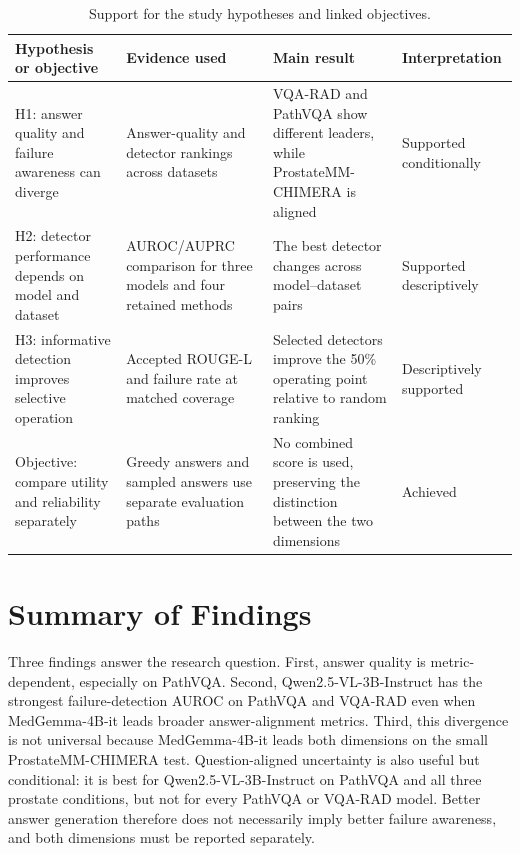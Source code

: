 \begin{table}[htbp]
    \centering
    \caption{Support for the study hypotheses and linked objectives.}
    \label{tab:hypothesis-support}
    \small
    \begin{tabularx}{\textwidth}{>{\raggedright\arraybackslash}p{3.1cm}XX>{\raggedright\arraybackslash}p{2.1cm}}
        \toprule
        Hypothesis or objective & Evidence used & Main result & Interpretation \\
        \midrule
        H1: answer quality and failure awareness can diverge & Answer-quality and detector rankings across datasets & VQA-RAD and PathVQA show different leaders, while ProstateMM-CHIMERA is aligned & Supported conditionally \\
        H2: detector performance depends on model and dataset & AUROC/AUPRC comparison for three models and four retained methods & The best detector changes across model--dataset pairs & Supported descriptively \\
        H3: informative detection improves selective operation & Accepted ROUGE-L and failure rate at matched coverage & Selected detectors improve the 50\% operating point relative to random ranking & Descriptively supported \\
        Objective: compare utility and reliability separately & Greedy answers and sampled answers use separate evaluation paths & No combined score is used, preserving the distinction between the two dimensions & Achieved \\
        \bottomrule
    \end{tabularx}
\end{table}

\section{Summary of Findings}

Three findings answer the research question. First, answer quality is metric-dependent, especially on PathVQA. Second, Qwen2.5-VL-3B-Instruct has the strongest failure-detection AUROC on PathVQA and VQA-RAD even when MedGemma-4B-it leads broader answer-alignment metrics. Third, this divergence is not universal because MedGemma-4B-it leads both dimensions on the small ProstateMM-CHIMERA test. Question-aligned uncertainty is also useful but conditional: it is best for Qwen2.5-VL-3B-Instruct on PathVQA and all three prostate conditions, but not for every PathVQA or VQA-RAD model. Better answer generation therefore does not necessarily imply better failure awareness, and both dimensions must be reported separately.
